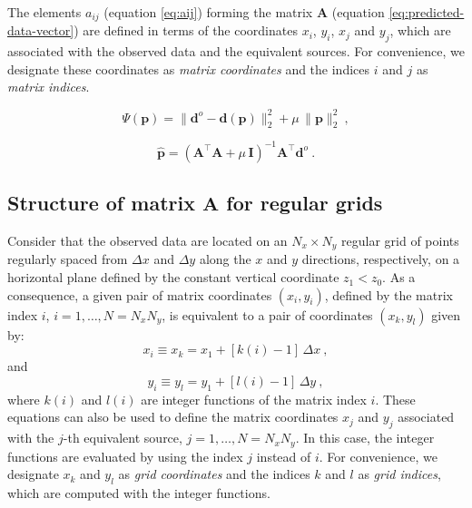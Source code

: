 \documentclass[manuscript,revised]{geophysics}
\begin{document}
The elements $a_{ij}$ (equation \ref{eq:aij}) forming the matrix 
$\mathbf{A}$ (equation \ref{eq:predicted-data-vector}) are defined in terms of the 
coordinates $x_{i}$, $y_{i}$, $x_{j}$ and $y_{j}$, which are associated with the
observed data and the equivalent sources.
For convenience, we designate these coordinates as \textit{matrix coordinates} and the 
indices $i$ and $j$ as \textit{matrix indices}.

\begin{equation}
\Psi(\mathbf{p}) = \| \mathbf{d}^{o} - \mathbf{d(p)} \|_{2}^{2} + 
\mu \, \| \mathbf{p} \|_{2}^{2} \: ,
\label{eq:goal-function}
\end{equation}

\begin{equation}
\hat{\mathbf{p}} = \left( \mathbf{A}^{\top}\mathbf{A} + 
\mu \, \mathbf{I} \right)^{-1}
\mathbf{A}^{\top} \mathbf{d}^{o} \: .
\label{eq:estimated-p-parameter-space}
\end{equation}


\subsection{Structure of matrix $\mathbf{A}$ for regular grids}

Consider that the observed data are located on an $N_{x} \times N_{y}$ regular grid of
points regularly spaced from $\Delta x$ and $\Delta y$ along the $x$ and $y$ directions,
respectively, on a horizontal plane defined by the constant vertical coordinate $z_{1} < z_{0}$. 
As a consequence, a given pair of matrix coordinates $(x_{i}, y_{i})$, defined by the matrix index 
$i$, $i = 1, \dots, N = N_{x} N_{y}$, is equivalent to a pair of coordinates $(x_{k}, y_{l})$
given by:
\begin{equation}
x_{i} \equiv x_{k} = x_{1} + \left[ k(i) - 1 \right] \, \Delta x \: , 
\label{eq:xi}
\end{equation}
and
\begin{equation}
y_{i} \equiv y_{l} = y_{1} + \left[ l(i) - 1 \right] \, \Delta y \: ,
\label{eq:yi}
\end{equation}
where $k(i)$ and $l(i)$ are integer functions of the matrix index $i$.
These equations can also be used to define the matrix coordinates 
$x_{j}$ and $y_{j}$ associated with the $j$-th equivalent source,
$j = 1, \dots, N = N_{x}N_{y}$. In this case, the integer functions
are evaluated by using the index $j$ instead of $i$.
For convenience, we designate $x_{k}$ and $y_{l}$ as \textit{grid coordinates}
and the indices $k$ and $l$ as \textit{grid indices}, which are computed with
the integer functions.
\end{document}
